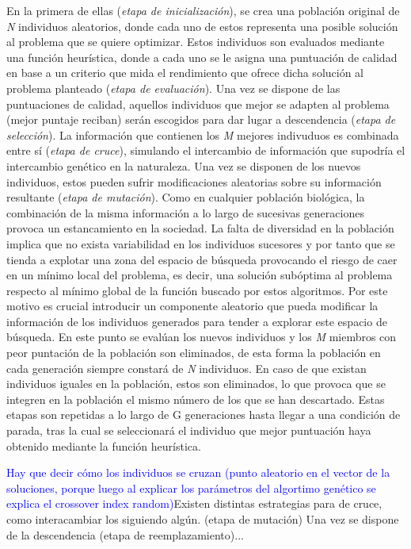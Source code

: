\documentclass{uathesis-es}
\begin{document}
En la primera de ellas (\textit{etapa de inicialización}), se crea una población original de \textit{N} individuos aleatorios, donde cada uno de estos representa una posible solución al problema que se quiere optimizar. Estos individuos son evaluados mediante una función heurística, donde a cada uno se le asigna una puntuación de calidad en base a un criterio que mida el rendimiento que ofrece dicha solución al problema planteado (\textit{etapa de evaluación}). Una vez se dispone de las puntuaciones de calidad, aquellos individuos que mejor se adapten al problema (mejor puntaje reciban) serán escogidos para dar lugar a descendencia (\textit{etapa de selección}). La información que contienen los \textit{M} mejores indivuduos es combinada entre sí (\textit{etapa de cruce}), simulando el intercambio de información que supodría el intercambio genético en la naturaleza. Una vez se disponen de los nuevos individuos, estos pueden sufrir modificaciones aleatorias sobre su información resultante (\textit{etapa de mutación}). Como en cualquier población biológica, la combinación  de la misma información a lo largo de sucesivas generaciones provoca un estancamiento en la sociedad. La falta de diversidad en la población implica que no exista variabilidad en los individuos sucesores y por tanto que se tienda a explotar una zona del espacio de búsqueda provocando el riesgo de caer en un mínimo local del problema, es decir, una solución subóptima al problema respecto al mínimo global de la función buscado por estos algoritmos. Por este motivo es crucial introducir un componente aleatorio que pueda modificar la información de los individuos generados para tender a explorar este espacio de búsqueda. En este punto se evalúan los nuevos individuos y los \textit{M} miembros con peor puntación de la población son eliminados, de esta forma la población en cada generación siempre constará de \textit{N} individuos. En caso de que existan individuos iguales en la población, estos son eliminados, lo que provoca que se integren en la población el mismo número de los que se han descartado. Estas etapas son repetidas a lo largo de G generaciones hasta llegar a una condición de parada, tras la cual se seleccionará el individuo que mejor puntuación haya obtenido mediante la función heurística.

\textcolor{blue}{Hay que decir cómo los individuos se cruzan (punto aleatorio en el vector de la soluciones, porque luego al explicar los parámetros del algortimo genético se explica el crossover index random)}Existen distintas estrategias para de cruce, como interacambiar los   siguiendo algún. (etapa de mutación) Una vez se dispone de la descendencia (etapa de reemplazamiento)...
\end{document}
